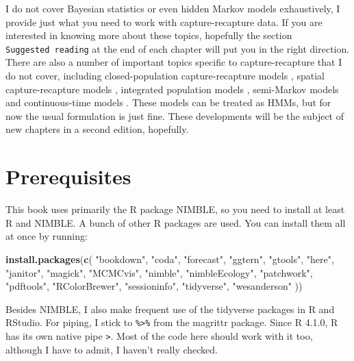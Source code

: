 \documentclass[
  12pt,
]{krantz}
\newenvironment{Shaded}{\begin{snugshade}}{\end{snugshade}}
\newcommand{\FunctionTok}[1]{\textcolor[rgb]{0.13,0.29,0.53}{\textbf{#1}}}
\newcommand{\NormalTok}[1]{#1}
\newcommand{\StringTok}[1]{\textcolor[rgb]{0.31,0.60,0.02}{#1}}
\begin{document}
I do not cover Bayesian statistics or even hidden Markov models exhaustively, I provide just what you need to work with capture-recapture data. If you are interested in knowing more about these topics, hopefully the section \texttt{Suggested\ reading} at the end of each chapter will put you in the right direction. There are also a number of important topics specific to capture-recapture that I do not cover, including closed-population capture-recapture models \citep{WilliamsEtAl2002}, spatial capture-recapture models \citep{RoyleEtAl2013book}, integrated population models \citep{BesbeasMorgan2019}, semi-Markov models \citep[e.g.][]{choquet_semi-markov_2011} and continuous-time models \citep{rushing2023continuouscr}. These models can be treated as HMMs, but for now the usual formulation is just fine. These developments will be the subject of new chapters in a second edition, hopefully.

\section*{Prerequisites}\label{prerequisites}


This book uses primarily the R package NIMBLE, so you need to install at least R and NIMBLE. A bunch of other R packages are used. You can install them all at once by running:

\begin{Shaded}
\begin{Highlighting}[]
\FunctionTok{install.packages}\NormalTok{(}\FunctionTok{c}\NormalTok{(}
  \StringTok{"bookdown"}\NormalTok{, }\StringTok{"coda"}\NormalTok{, }\StringTok{"forecast"}\NormalTok{, }\StringTok{"ggtern"}\NormalTok{, }\StringTok{"gtools"}\NormalTok{, }
  \StringTok{"here"}\NormalTok{, }\StringTok{"janitor"}\NormalTok{, }\StringTok{"magick"}\NormalTok{, }\StringTok{"MCMCvis"}\NormalTok{, }\StringTok{"nimble"}\NormalTok{, }
  \StringTok{"nimbleEcology"}\NormalTok{, }\StringTok{"patchwork"}\NormalTok{, }\StringTok{"pdftools"}\NormalTok{, }
  \StringTok{"RColorBrewer"}\NormalTok{, }\StringTok{"sessioninfo"}\NormalTok{, }\StringTok{"tidyverse"}\NormalTok{, }
  \StringTok{"wesanderson"} 
\NormalTok{))}
\end{Highlighting}
\end{Shaded}

Besides NIMBLE, I also make frequent use of the tidyverse packages in R and RStudio. For piping, I stick to \texttt{\%\textgreater{}\%} from the magrittr package. Since R 4.1.0, R has its own native pipe \texttt{\textbar{}\textgreater{}}. Most of the code here should work with it too, although I have to admit, I haven't really checked.
\end{document}
